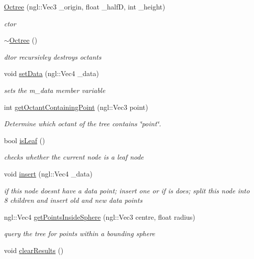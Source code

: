 \begin{DoxyCompactItemize}
\item 
\hyperlink{classOctree_a18c97528102fc6c7b0afcf62d4256d6b}{Octree} (ngl\-::\-Vec3 \-\_\-origin, float \-\_\-half\-D, int \-\_\-height)
\begin{DoxyCompactList}\small\item\em ctor \end{DoxyCompactList}\item 
\hypertarget{classOctree_a6705a6ae06fab5a0dfdd79f45576020d}{\hyperlink{classOctree_a6705a6ae06fab5a0dfdd79f45576020d}{$\sim$\-Octree} ()}\label{classOctree_a6705a6ae06fab5a0dfdd79f45576020d}

\begin{DoxyCompactList}\small\item\em dtor recursivley destroys octants \end{DoxyCompactList}\item 
void \hyperlink{classOctree_a5e902807821df11683179aea5e43d731}{set\-Data} (ngl\-::\-Vec4 \-\_\-data)
\begin{DoxyCompactList}\small\item\em sets the m\-\_\-data member variable \end{DoxyCompactList}\item 
int \hyperlink{classOctree_adb4be848e01fce3568b83cd8a4117e26}{get\-Octant\-Containing\-Point} (ngl\-::\-Vec3 point)
\begin{DoxyCompactList}\small\item\em Determine which octant of the tree contains \char`\"{}point\char`\"{}. \end{DoxyCompactList}\item 
bool \hyperlink{classOctree_a5311ba068ebb82dbc917e0178f052ec0}{is\-Leaf} ()
\begin{DoxyCompactList}\small\item\em checks whether the current node is a leaf node \end{DoxyCompactList}\item 
void \hyperlink{classOctree_a9a1092104eeea9725e66ae188b8db736}{insert} (ngl\-::\-Vec4 \-\_\-data)
\begin{DoxyCompactList}\small\item\em if this node doesnt have a data point; insert one or if is does; split this node into 8 children and insert old and new data points \end{DoxyCompactList}\item 
ngl\-::\-Vec4 \hyperlink{classOctree_a814ed4196b414829c44f55c8b65a7517}{get\-Points\-Inside\-Sphere} (ngl\-::\-Vec3 centre, float radius)
\begin{DoxyCompactList}\small\item\em query the tree for points within a bounding sphere \end{DoxyCompactList}\item 
\hypertarget{classOctree_aca0adcb1047b4ced99f1e3449ac88036}{void \hyperlink{classOctree_aca0adcb1047b4ced99f1e3449ac88036}{clear\-Results} ()}\label{classOctree_aca0adcb1047b4ced99f1e3449ac88036}


\end{DoxyCompactItemize}
